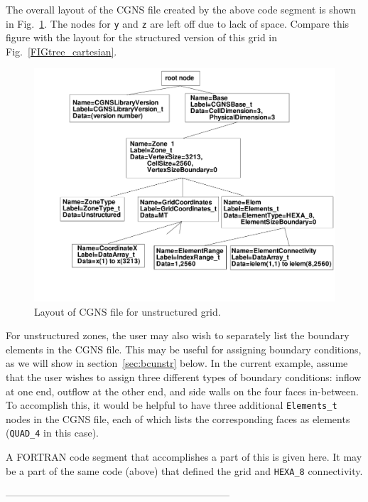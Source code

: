 \documentclass[12pt]{article}
\begin{document}
The overall layout of the CGNS file created by the above code segment
is shown in Fig.~\ref{FIGtree_cartesianU}.  The nodes for {\tt y} and
{\tt z} are left off due to lack of space.  
Compare this figure with the
layout for the structured version of this grid in
Fig.~\ref{FIGtree_cartesian}.

\begin{figure}[hpbt]
\centerline{{\includegraphics[width=150mm]{figures/tree_cartesianU}}}
\caption{Layout of CGNS file for unstructured grid.}
\label{FIGtree_cartesianU}
\end{figure}
%

For unstructured zones, the user may also wish to separately list the
boundary elements in the CGNS file.  This may be useful for assigning boundary
conditions, as we will show in section~\ref{sec:bcunstr} below.
In the current example, assume that the user wishes to assign three
different types of boundary conditions: inflow at one end,
outflow at the other end, and side walls on the four
faces in-between.  To accomplish this, it would be helpful to have three
additional {\tt Elements\_t} nodes in the CGNS file, each of which lists the 
corresponding faces as elements ({\tt QUAD\_4} in this case). 

A FORTRAN code segment that accomplishes a part of this is given here.  It may
be a part of the same code (above) that defined the grid and {\tt HEXA\_8}
connectivity.

--------------------------------------------------------------------
\end{document}
